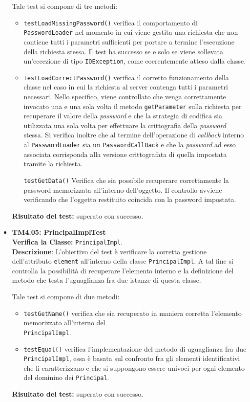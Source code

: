 \begin{itemize}
Tale test si compone di tre metodi:
\begin{itemize}

\item \texttt{testLoadMissingPassword()} verifica il comportamento di \texttt{PasswordLoader} nel momento in cui viene gestita una richiesta che non contiene tutti i parametri sufficienti per portare a termine l'esecuzione della richiesta stessa. Il test ha successo se e solo se viene sollevata un'eccezione di tipo \texttt{IOException}, come coerentemente atteso dalla classe.

\item \texttt{testLoadCorrectPassword()} verifica il corretto funzionamento della classe nel caso in cui la richiesta al server contenga tutti i parametri necessari. Nello specifico, viene controllato che venga correttamente invocato una e una sola volta il metodo \texttt{getParameter} sulla richiesta per recuperare il valore della \textit{password} e che la strategia di codifica sia utilizzata una sola volta per effettuare la crittografia della \textit{password} stessa. Si verifica inoltre che al termine dell'operazione di \textit{callback} interno al \texttt{PasswordLoader} sia un \texttt{PasswordCallBack} e che la \textit{password} ad esso associata corrisponda alla versione crittografata di quella impostata tramite la richiesta.

\texttt{testGetData()} Verifica che sia possibile recuperare correttamente la password memorizzata all'interno dell'oggetto.
Il controllo avviene verificando che l'oggetto restituito coincida con la password impostata.
 
\end{itemize}
\textbf{Risultato del test:} superato con successo.


\item[\passed] \textbf{TM4.05: PrincipalImplTest}\\
\textbf{Verifica la Classe:} \texttt{PrincipalImpl}.\\
\textbf{Descrizione}: L'obiettivo del test è verificare la corretta gestione dell'attributo \texttt{element} all'interno della classe \texttt{PrincipalImpl}. A tal fine si controlla la possibilità di recuperare l'elemento interno e la definizione del metodo che testa l'uguaglianza fra due istanze di questa classe.

Tale test si compone di due metodi:
\begin{itemize}
\item \texttt{testGetName()} verifica che sia recuperato in maniera corretta l'elemento memorizzato all'interno del\\ \texttt{PrincipalImpl}.

\item \texttt{testEqual()} verifica l'implementazione del metodo di uguaglianza fra due \\ \texttt{PrincipalImpl}, essa è basata sul confronto fra gli elementi identificativi che li caratterizzano e che si suppongono essere univoci per ogni elemento del dominino dei \texttt{Principal}.
\end{itemize}
\textbf{Risultato del test:} superato con successo.

\end{itemize}

